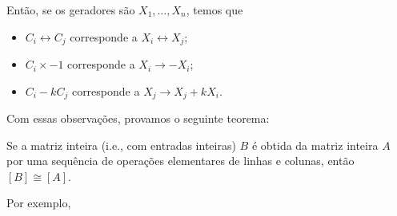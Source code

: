     	\par\vspace{0.3cm} Então, se os geradores são $X_1, \dots, X_n$, temos que
    	\begin{itemize}
    		\item $C_i\leftrightarrow C_j$ corresponde a $X_i\leftrightarrow X_j$;
    		\item $C_i\times-1$ corresponde a $X_i\to -X_i$;
    		\item $C_i -kC_j$ corresponde a $X_j\to X_j + kX_i$.
    	\end{itemize}
    	Com essas observações, provamos o seguinte teorema:
    	\begin{theorem}
    	\label{equivalencia matrizes}
    		Se a matriz inteira (i.e., com entradas inteiras) $B$ é obtida da matriz inteira $A$ 
    		por uma sequência de operações elementares de linhas e colunas, então $[B]\cong[A]$.
    	\end{theorem}
    	Por exemplo,

